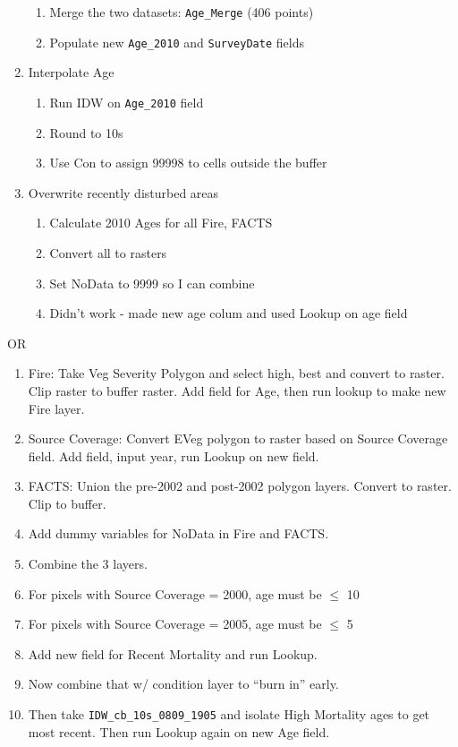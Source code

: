 \begin{enumerate}
\begin{enumerate}
        \item Merge the two datasets: \lstinline{Age_Merge} (406 points)
        \item Populate new \lstinline{Age_2010} and \lstinline{SurveyDate} fields
    \end{enumerate}
\item Interpolate Age
    \begin{enumerate}
    \item Run IDW on \lstinline{Age_2010} field
    \item Round to 10s
    \item Use Con to assign 99998 to cells outside the buffer
    \end{enumerate}
\item Overwrite recently disturbed areas
    \begin{enumerate}
    \item Calculate 2010 Ages for all Fire, FACTS
    \item Convert all to rasters
    \item Set NoData to 9999 so I can combine
    \item Didn't work - made new age colum and used Lookup on age field
    \end{enumerate}
\end{enumerate}

OR

\begin{enumerate}
    \item Fire: Take Veg Severity Polygon and select high, best and convert to raster. Clip raster to buffer raster. Add field for Age, then run lookup to make new Fire layer.
    \item Source Coverage: Convert EVeg polygon to raster based on Source Coverage field. Add field, input year, run Lookup on new field.
    \item FACTS: Union the pre-2002 and post-2002 polygon layers. Convert to raster. Clip to buffer.
    \item Add dummy variables for NoData in Fire and FACTS.
    \item Combine the 3 layers.
    \item For pixels with Source Coverage = 2000, age must be $\leq$ 10
    \item For pixels with Source Coverage = 2005, age must be $\leq$ 5
    \item Add new field for Recent Mortality and run Lookup.
    \item Now combine that w/ condition layer to ``burn in'' early.
    \item Then take \lstinline{IDW_cb_10s_0809_1905} and isolate High Mortality ages to get most recent. Then run Lookup again on new Age field.
\end{enumerate}

